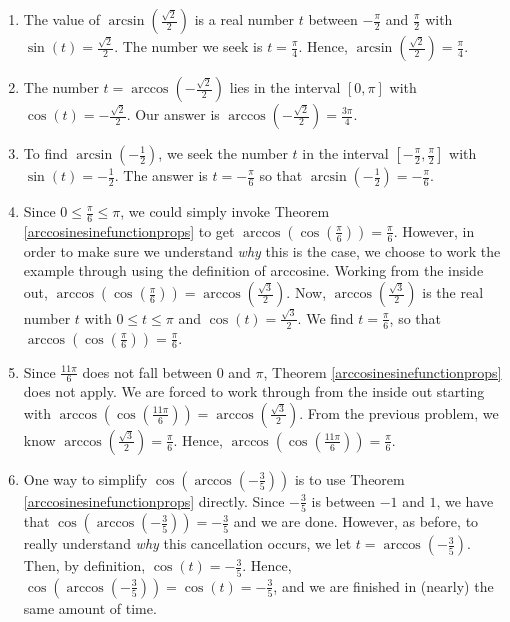 \begin{ex}
\begin{enumerate}
\begin{enumerate}
\item  The value of $\arcsin\left(\frac{\sqrt{2}}{2}\right)$ is a real number $t$ between $-\frac{\pi}{2}$ and $\frac{\pi}{2}$ with $\sin(t) = \frac{\sqrt{2}}{2}$.  The number we seek is  $t = \frac{\pi}{4}$. Hence, $\arcsin\left(\frac{\sqrt{2}}{2}\right) = \frac{\pi}{4}$.

\item  The number $t = \arccos\left(-\frac{\sqrt{2}}{2}\right)$ lies in the interval $[0,\pi]$ with $\cos(t) = -\frac{\sqrt{2}}{2}$.  Our answer is $\arccos\left(-\frac{\sqrt{2}}{2}\right) = \frac{3\pi}{4}$.

\item  To find  $\arcsin\left(-\frac{1}{2}\right)$, we seek the number $t$ in the interval $\left[-\frac{\pi}{2}, \frac{\pi}{2}\right]$ with $\sin(t) = -\frac{1}{2}$.  The answer is $t = -\frac{\pi}{6}$ so that $\arcsin\left(-\frac{1}{2}\right) = -\frac{\pi}{6}$.

\item  Since $0 \leq \frac{\pi}{6} \leq \pi$, we could simply invoke Theorem \ref{arccosinesinefunctionprops} to get $\arccos\left( \cos\left(\frac{\pi}{6}\right)\right) = \frac{\pi}{6}$.  However, in order to make sure we understand \textit{why} this is the case, we choose to work the example through using the definition of arccosine.  Working from the inside out,  $\arccos\left( \cos\left(\frac{\pi}{6}\right)\right) = \arccos\left( \frac{\sqrt{3}}{2}\right)$.  Now, $\arccos\left( \frac{\sqrt{3}}{2}\right)$ is the real number $t$ with $0 \leq t \leq \pi$ and $\cos(t) = \frac{\sqrt{3}}{2}$.  We find $t = \frac{\pi}{6}$, so that  $\arccos\left( \cos\left(\frac{\pi}{6}\right)\right) = \frac{\pi}{6}$.

\item Since $\frac{11\pi}{6}$ does not fall between $0$ and $\pi$, Theorem \ref{arccosinesinefunctionprops} does not apply.  We are forced to work through from the inside out starting with  $\arccos\left( \cos\left(\frac{11\pi}{6}\right)\right) = \arccos\left(\frac{\sqrt{3}}{2}\right)$.  From the previous problem, we know $\arccos\left(\frac{\sqrt{3}}{2}\right) = \frac{\pi}{6}$.  Hence,  $\arccos\left( \cos\left(\frac{11\pi}{6}\right)\right) = \frac{\pi}{6}$.

\item  One way to simplify  $\cos\left(\arccos\left(-\frac{3}{5}\right)\right)$ is to use Theorem \ref{arccosinesinefunctionprops} directly.  Since $-\frac{3}{5}$ is between $-1$ and $1$, we have that $\cos\left(\arccos\left(-\frac{3}{5}\right)\right) = -\frac{3}{5}$ and we are done.  However, as before, to really understand \textit{why} this cancellation occurs, we  let $t = \arccos\left(-\frac{3}{5}\right)$.  Then, by definition,  $\cos(t) = -\frac{3}{5}$. Hence, $\cos\left(\arccos\left(-\frac{3}{5}\right)\right) = \cos(t) = -\frac{3}{5}$, and we are finished in (nearly) the same amount of time.


\end{enumerate}
\end{enumerate}
\end{ex}
